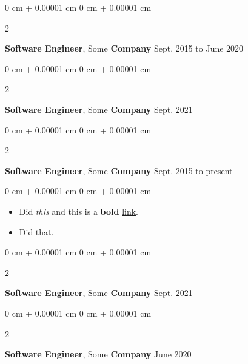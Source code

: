\documentclass[10pt, letterpaper]{article}
\newenvironment{highlights}{
    \begin{itemize}[
        topsep=0.10 cm,
        parsep=0.10 cm,
        partopsep=0pt,
        itemsep=0pt,
        leftmargin=0 cm + 10pt
    ]
}{
    \end{itemize}
        
    \vspace{-0.10cm}
} %
\newenvironment{onecolentry}{
    \begin{adjustwidth}{
        0 cm + 0.00001 cm
    }{
        0 cm + 0.00001 cm
    }
}{
    \end{adjustwidth}
} %
\newenvironment{twocolentry}[2][]{
    \onecolentry
    \def\secondColumn{#2}
    \setcolumnwidth{\fill, 4.1 cm}
    \begin{paracol}{2}
}{
    \switchcolumn \raggedleft \secondColumn
    \end{paracol}
    \endonecolentry
} %
\begin{document}
        \vspace{0.15 cm}

        \begin{twocolentry}{
            Sept. 2015 to June 2020
        }
            \textbf{Software Engineer}, Some \textbf{Company}\end{twocolentry}

        \vspace{0.10 cm}


        \vspace{0.15 cm}

        \begin{twocolentry}{
            Sept. 2021
        }
            \textbf{Software Engineer}, Some \textbf{Company}\end{twocolentry}

        \vspace{0.10 cm}


        \vspace{0.15 cm}

        \begin{twocolentry}{
            Sept. 2015 to present
        }
            \textbf{Software Engineer}, Some \textbf{Company}\end{twocolentry}

        \vspace{0.10 cm}
        \begin{onecolentry}
            \begin{highlights}
                \item Did \textit{this} and this is a \textbf{bold} \href{https://example.com}{link}.
                \item Did that.
            \end{highlights}
        \end{onecolentry}


        \vspace{0.15 cm}

        \begin{twocolentry}{
            Sept. 2021
        }
            \textbf{Software Engineer}, Some \textbf{Company}\end{twocolentry}

        \vspace{0.10 cm}


        \vspace{0.15 cm}

        \begin{twocolentry}{
            June 2020
        }
            \textbf{Software Engineer}, Some \textbf{Company}\end{twocolentry}
\end{document}
